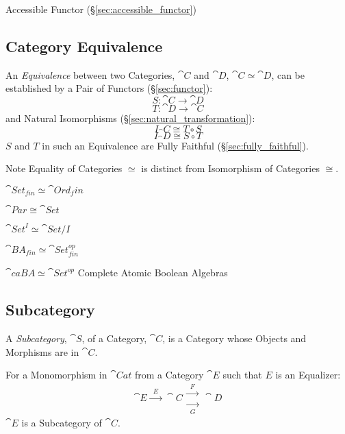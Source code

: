 Accessible Functor (\S\ref{sec:accessible_functor})



\subsection{Category Equivalence}\label{sec:category_equivalence}

An \emph{Equivalence} between two Categories, $\cat{C}$ and
$\cat{D}$, $\cat{C} \simeq \cat{D}$, can be established by a
Pair of Functors (\S\ref{sec:functor}):
\[
  S : \cat{C} \rightarrow \cat{D}
\]\[
  T : \cat{D} \rightarrow \cat{C}
\]
and Natural Isomorphisms (\S\ref{sec:natural_transformation}):
\[
  I_\cat{C} \cong T \circ S
\]\[
  I_\cat{D} \cong S \circ T
\]
$S$ and $T$ in such an Equivalence are Fully Faithful
(\S\ref{sec:fully_faithful}).

\fist Note Equality of Categories $\simeq$ is distinct from
Isomorphism of Categories $\cong$.

$\cat{Set}_{fin} \simeq \cat{Ord}_fin$

$\cat{Par} \cong \cat{Set}$

$\cat{Set}^I \simeq \cat{Set}/I$

$\cat{BA}_{fin} \simeq \cat{Set}_{fin}^{op}$

$\cat{caBA} \simeq \cat{Set}^{op}$ Complete Atomic Boolean
Algebras %



\subsection{Subcategory}\label{sec:subcategory}

A \emph{Subcategory}, $\cat{S}$, of a Category, $\cat{C}$, is a
Category whose Objects and Morphisms are in $\cat{C}$.

For a Monomorphism in $\cat{Cat}$ from a Category $\cat{E}$ such
that $E$ is an Equalizer:
\[
  \cat{E} \xrightarrow{\;\;E\;\;} \cat{C}
  \begin{matrix}
  \xrightarrow{\;\;F\;\;}\\
  \xrightarrow[\;\;G\;\;]{}
  \end{matrix}
  \cat{D}
\]
$\cat{E}$ is a Subcategory of $\cat{C}$.




